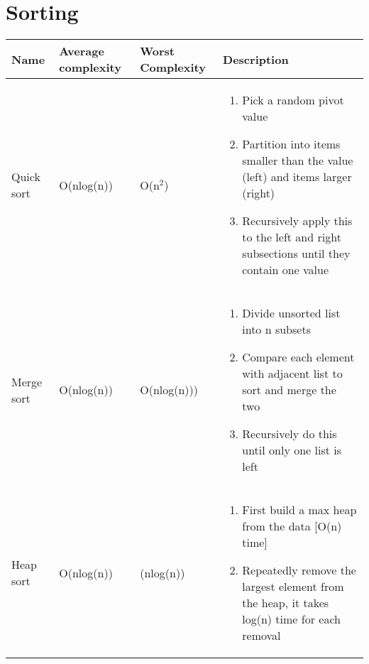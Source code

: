 \section{Sorting}

\begin{center}
\begin{longtable}{|l|l|l|p{7cm}|}
\hline
\textbf{Name} & \textbf{Average complexity} & \textbf{Worst Complexity} & \textbf{Description} \\
\hline
Quick sort & O(nlog(n)) & O(n$^{2}$) 
           & \begin{enumerate}
                \item Pick a random pivot value 
                \item Partition into items smaller than the value (left) and 
                      items larger (right)
                \item Recursively apply this to the left and right subsections
                      until they contain one value
              \end{enumerate}\\
\hline

Merge sort & O(nlog(n)) & O(nlog(n))) 
           & \begin{enumerate}
                \item Divide unsorted list into n subsets
                \item Compare each element with adjacent list to sort and merge
                      the two
                \item Recursively do this until only one list is left
              \end{enumerate}\\

\hline

Heap sort & O(nlog(n)) & (nlog(n)) 
          & \begin{enumerate}
                \item First build a max heap from the data [O(n) time]
                \item Repeatedly remove the largest element from the heap, 
                      it takes log(n) time for each removal

              \end{enumerate}\\
\hline

\end{longtable}
\end{center}
